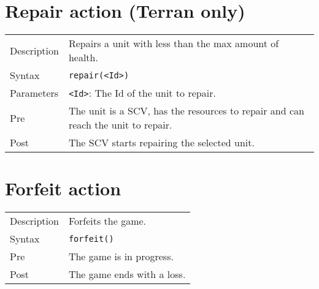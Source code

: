 \section{Repair action (Terran only)}
\begin{tabularx}{\textwidth}{lX}
 Description & Repairs a unit with less than the max amount of health. \\
 Syntax & \verb|repair(<Id>)| \\
 Parameters & \verb|<Id>|: The Id of the unit to repair. \\
 Pre & The unit is a SCV, has the resources to repair and can reach the unit to repair. \\
 Post & The SCV starts repairing the selected unit.
\end{tabularx}

\section{Forfeit action}
\begin{tabularx}{\textwidth}{lX}
 Description & Forfeits the game. \\
 Syntax & \verb|forfeit()| \\
 Pre & The game is in progress. \\
 Post & The game ends with a loss.
\end{tabularx}


